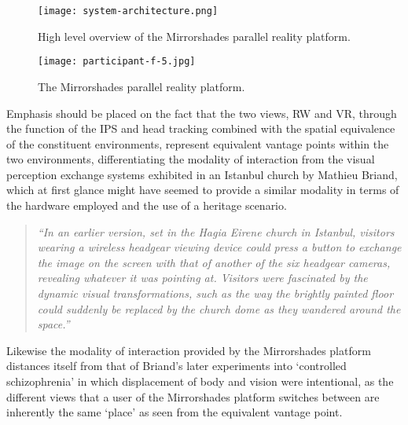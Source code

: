 \begin{figure}[h]
	\begin{center}
		\texttt{[image: system-architecture.png]}
		\caption{High level overview of the Mirrorshades parallel reality platform.}
		\label{systemarchitecture}
	\end{center}
\end{figure}

\begin{figure}[h]
	\begin{center}
		\texttt{[image: participant-f-5.jpg]}
		\caption{The Mirrorshades parallel reality platform.}
		\label{participant-f-5.jpg}
	\end{center}
\end{figure}

Emphasis should be placed on the fact that the two views, RW and VR, through the function of the IPS and head tracking combined with the spatial equivalence of the constituent environments, represent equivalent vantage points within the two environments, differentiating the modality of interaction from the visual perception exchange systems exhibited in an Istanbul church by Mathieu Briand, which at first glance might have seemed to provide a similar modality in terms of the hardware employed and the use of a heritage scenario.

\begin{quote}
	\textit{``In an earlier version, set in the Hagia Eirene church in Istanbul, visitors wearing a wireless headgear viewing device could press a button to exchange the image on the screen with that of another of the six headgear cameras, revealing whatever it was pointing at. Visitors were fascinated by the dynamic visual transformations, such as the way the brightly painted floor could suddenly be replaced by the church dome as they wandered around the space.''}~\cite{Jones2006}
\end{quote}

Likewise the modality of interaction provided by the Mirrorshades platform distances itself from that of Briand's later experiments into `controlled schizophrenia' in which displacement of body and vision were intentional, as the different views that a user of the Mirrorshades platform switches between are inherently the same `place' as seen from the equivalent vantage point.

